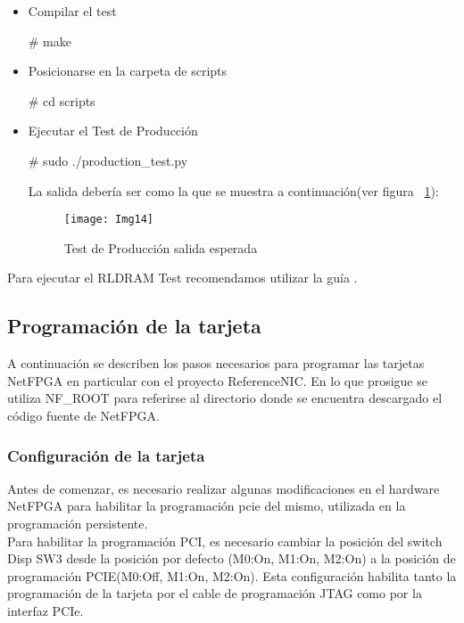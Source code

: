 \begin{itemize}
\begin{itemize}
\item Compilar el test
\begin{bash}
# make
\end{bash}

\item Posicionarse en la carpeta de scripts
\begin{bash}
# cd scripts
\end{bash}

\item Ejecutar el Test de Producción
\begin{bash}
# sudo ./production_test.py
\end{bash}

La salida debería ser como la que se muestra a continuación(ver figura ~\ref{fig:Img14}):

\newpage
\begin{figure}[htbp!] 
\centering    
\texttt{[image: Img14]}
\caption[Test de Producción salida esperada]{Test de Producción salida esperada}
\label{fig:Img14}
\end{figure}
\end{itemize}

\end{itemize}

Para ejecutar el RLDRAM Test recomendamos utilizar la guía \citep{NetFPGA8}.

\subsection{Programación de la tarjeta}

A continuación se describen los pasos necesarios para programar las tarjetas NetFPGA en particular con el proyecto ReferenceNIC. En lo que prosigue se utiliza NF\_ROOT para referirse al directorio donde se encuentra descargado el código fuente de NetFPGA.

\subsubsection{Configuración de la tarjeta}
Antes de comenzar, es necesario realizar algunas modificaciones en el hardware NetFPGA para habilitar la programación pcie del mismo, utilizada en la programación persistente.\\ 

Para habilitar la programación PCI, es necesario cambiar la posición del switch Disp SW3 desde la posición por defecto (M0:On, M1:On, M2:On) a la posición de programación PCIE(M0:Off, M1:On, M2:On). Esta configuración habilita tanto la programación de la tarjeta por el cable de programación JTAG como por la interfaz PCIe.\\

